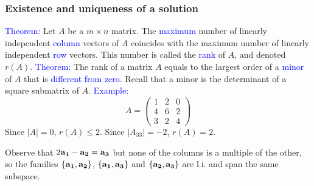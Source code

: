 \documentclass[11pt,aspectratio=169]{beamer}
\begin{document}
\begin{frame}
\frametitle{Existence and uniqueness of a solution}
\begin{small}
\textcolor{blue}{Theorem:} Let $A$ be a $m \times n$ matrix. 
The \textcolor{blue}{maximum} number of linearly independent \textcolor{blue}{column} vectors of $A$ coincides with the maximum number of linearly independent \textcolor{blue}{row} vectors. 
\vskip 10pt
This number is called the \textcolor{blue}{rank} of $A$, and denoted $r(A)$. 
\vskip 10pt
\textcolor{blue}{Theorem:} The rank of a matrix $A$ equals to the largest order of a \textcolor{blue}{minor} of $A$ that is \textcolor{blue}{different from zero}. Recall that a minor is the determinant of a square submatrix of $A$.
\vskip 10pt
\textcolor{blue}{Example:}
\begin{equation*}
A=\begin{pmatrix}
1 & 2 & 0\\
4 & 6 & 2 \\
3 & 2 & 4
\end{pmatrix}
\end{equation*}
Since $\vert A \vert=0$, $r(A) \leq 2$. Since $\vert A_{33} \vert=-2$, $r(A)=2$.

\begin{tiny} Observe that $2{\bf a_1}-{\bf a_2}={\bf a_3}$ but none of the  columns is a multiple of the other, so 
the  families $\{{\bf a_1}, {\bf a_2}\}$, $\{{\bf a_1}, {\bf a_3}\}$ and $\{{\bf a_2}, {\bf a_3}\}$  are l.i. and span the same subspace.\end{tiny}



\end{small}
\end{frame}
\end{document}
